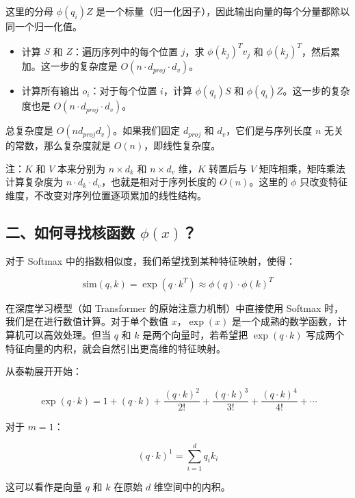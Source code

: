 这里的分母 \(\phi(q_i)Z\) 是一个标量（归一化因子），因此输出向量的每个分量都除以同一个归一化值。

\begin{itemize}
\tightlist
\item
  计算 \(S\) 和 \(Z\)：遍历序列中的每个位置 \(j\)，求 \(\phi(k_j)^T v_j\) 和 \(\phi(k_j)^T\)，然后累加。这一步的复杂度是 \(O(n\cdot d_{proj}\cdot d_v)\)。
\item
  计算所有输出 \(o_i\)：对于每个位置 \(i\)，计算 \(\phi(q_i)S\) 和 \(\phi(q_i)Z\)。这一步的复杂度也是 \(O(n\cdot d_{proj}\cdot d_v)\)。
\end{itemize}

总复杂度是 \(O(nd_{proj}d_v)\)。如果我们固定 \(d_{proj}\) 和 \(d_v\)，它们是与序列长度 \(n\) 无关的常数，那么复杂度就是 \(O(n)\)，即线性复杂度。

注：\(K\) 和 \(V\) 本来分别为 \(n \times d_k\) 和 \(n \times d_v\) 维，\(K\) 转置后与 \(V\) 矩阵相乘，矩阵乘法计算复杂度为 \(n\cdot d_k\cdot d_v\)，也就是相对于序列长度的 \(O(n)\)。这里的 \(\phi\) 只改变特征维度，不改变对序列位置逐项累加的线性结构。

\hypertarget{ux4e8cux5982ux4f55ux5bfbux627eux6838ux51fdux6570-phix}{%
\subsection{\texorpdfstring{二、如何寻找核函数 \(\phi(x)\)？}{二、如何寻找核函数 \textbackslash phi(x)？}}\label{ux4e8cux5982ux4f55ux5bfbux627eux6838ux51fdux6570-phix}}

对于 Softmax 中的指数相似度，我们希望找到某种特征映射，使得：

\[
\mathrm{sim}(q,k) = \exp(q\cdot k^T) \approx \phi(q)\cdot\phi(k)^T
\]

在深度学习模型（如 Transformer 的原始注意力机制）中直接使用 Softmax 时，我们是在进行数值计算。对于单个数值 \(x\)，\(\exp(x)\) 是一个成熟的数学函数，计算机可以高效处理。但当 \(q\) 和 \(k\) 是两个向量时，若希望把 \(\exp(q\cdot k)\) 写成两个特征向量的内积，就会自然引出更高维的特征映射。

从泰勒展开开始：

\[
\exp(q\cdot k)
= 1 + (q\cdot k) + \frac{(q\cdot k)^2}{2!}
+ \frac{(q\cdot k)^3}{3!}
+ \frac{(q\cdot k)^4}{4!}
+ \cdots
\]

对于 \(m=1\)：

\[
(q\cdot k)^1 = \sum_{i=1}^{d}q_i k_i
\]

这可以看作是向量 \(q\) 和 \(k\) 在原始 \(d\) 维空间中的内积。

